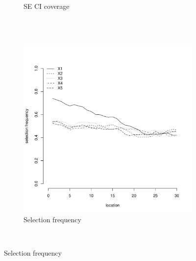 \documentclass[authoryear, review, 11pt]{elsarticle}
\begin{document}
\begin{figure}
\begin{subfigure}[b]{0.45\textwidth}
		\caption{SE CI coverage}
	\end{subfigure}%
	\\%
	~ %
	\begin{subfigure}[b]{0.45\textwidth}
	\centering
		\includegraphics[width=\textwidth]{../../figures/simulation/15.28.profile_selection.pdf}
		\caption{Selection frequency}
	\end{subfigure}
	~ %

\end{figure}
\end{document}

